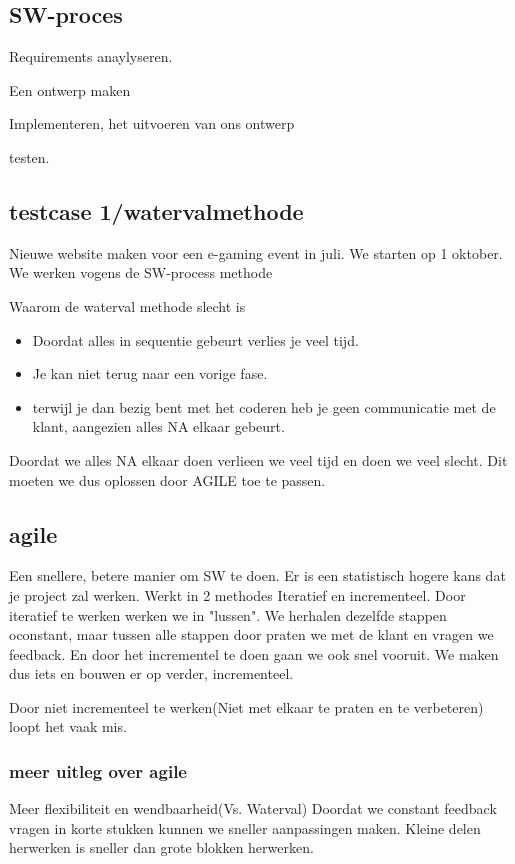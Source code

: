 \documentclass{article}
\begin{document}
\subsection{SW-proces}
Requirements anaylyseren.

Een ontwerp maken

Implementeren, het uitvoeren van ons ontwerp

testen.

\subsection{testcase 1/watervalmethode}
Nieuwe website maken voor een e-gaming event in juli. We starten op 1 oktober.
We werken vogens de SW-process methode

Waarom de waterval methode slecht is
\begin{itemize}
\item Doordat alles in sequentie gebeurt verlies je veel tijd.
\item Je kan niet terug naar een vorige fase.
\item terwijl je dan bezig bent met het coderen heb je geen communicatie met de klant, aangezien alles NA elkaar gebeurt.
\end{itemize}
Doordat we alles NA elkaar doen verlieen we veel tijd en doen we veel slecht.
Dit moeten we dus oplossen door AGILE toe te passen.

\subsection{agile}
Een snellere, betere manier om SW te doen. Er is een statistisch hogere kans dat je project zal werken. 
Werkt in 2 methodes
Iteratief en incrementeel. 
Door iteratief te werken werken we in "lussen". We herhalen dezelfde stappen oconstant, maar tussen alle stappen door praten we met de klant en vragen we feedback. En door het incrementel te doen gaan we ook snel vooruit.
We maken dus iets en bouwen er op verder, incrementeel.

Door niet incrementeel te werken(Niet met elkaar te praten en te verbeteren) loopt het vaak mis.

\subsubsection{meer uitleg over agile}
Meer flexibiliteit en wendbaarheid(Vs. Waterval)
Doordat we constant feedback vragen in korte stukken kunnen we sneller aanpassingen maken. Kleine delen herwerken is sneller dan grote blokken herwerken.
\end{document}
